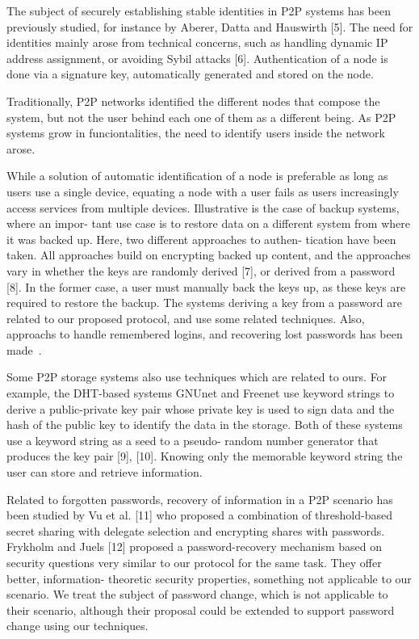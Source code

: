 The subject of securely establishing stable identities in P2P
systems has been previously studied, for instance by Aberer,
Datta and Hauswirth [5]. The need for identities mainly arose
from technical concerns, such as handling dynamic IP address
assignment, or avoiding Sybil attacks [6]. Authentication of a
node is done via a signature key, automatically generated and
stored on the node.

Traditionally, P2P networks identified the different nodes that compose the
system, but not the user behind each one of them as a different being.
As P2P systems grow in funciontalities, the need to identify users inside the
network arose.

While a solution of automatic identification of a node is preferable as long as
users use a single device, equating a node with a user fails as users
increasingly access services from multiple devices.
Illustrative is the case of backup systems, where an impor-
tant use case is to restore data on a different system from where
it was backed up. Here, two different approaches to authen-
tication have been taken. All approaches build on encrypting
backed up content, and the approaches vary in whether the
keys are randomly derived [7], or derived from a password [8].
In the former case, a user must manually back the keys up,
as these keys are required to restore the backup. The systems
deriving a key from a password are related to our proposed
protocol, and use some related techniques. Also, approachs to handle
remembered logins, and recovering lost passwords has been
made~\cite{peerson-passwords}.

Some P2P storage systems also use techniques which are
related to ours. For example, the DHT-based systems GNUnet
and Freenet use keyword strings to derive a public-private key
pair whose private key is used to sign data and the hash of
the public key to identify the data in the storage. Both of
these systems use a keyword string as a seed to a pseudo-
random number generator that produces the key pair [9], [10].
Knowing only the memorable keyword string the user can
store and retrieve information.

Related to forgotten passwords, recovery of information in a
P2P scenario has been studied by Vu et al. [11] who proposed
a combination of threshold-based secret sharing with delegate
selection and encrypting shares with passwords.
Frykholm and Juels [12] proposed a password-recovery
mechanism based on security questions very similar to our
protocol for the same task. They offer better, information-
theoretic security properties, something not applicable to our
scenario. We treat the subject of password change, which is not applicable to
their scenario, although their proposal could be extended to support password
change using our techniques.

